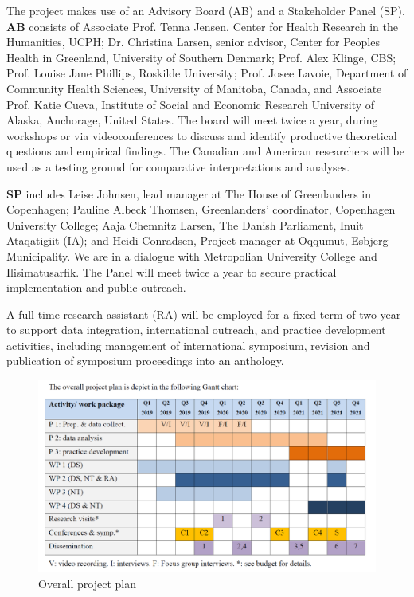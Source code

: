 \documentclass[twocolumn, issue, rga, authordate]{jote-new-article}
\begin{document}
The project makes use of an Advisory Board (AB) and a Stakeholder Panel
(SP). \textbf{AB} consists of Associate Prof. Tenna Jensen, Center for Health Research in the Humanities, UCPH; Dr. Christina Larsen, senior advisor, Center for Peoples Health in Greenland, University of Southern Denmark; Prof. Alex Klinge, CBS; Prof. Louise Jane Phillips, Roskilde University; Prof. Josee Lavoie, Department of Community Health Sciences, University of Manitoba, Canada, and Associate Prof. Katie Cueva, Institute of Social and Economic Research University of Alaska, Anchorage, United States. The board will meet twice a year, during workshops or via videoconferences to discuss and identify productive theoretical questions and empirical findings. The Canadian and American researchers will be used as a testing ground for comparative interpretations and analyses.

\textbf{SP} includes Leise Johnsen, lead manager at The House of Greenlanders in Copenhagen; Pauline Albeck Thomsen, Greenlanders'
coordinator, Copenhagen University College; Aaja Chemnitz Larsen, The Danish Parliament, Inuit Ataqatigiit (IA); and Heidi Conradsen, Project manager at Oqqumut, Esbjerg Municipality. We are in a dialogue with Metropolian University College and Ilisimatusarfik. The Panel will meet twice a year to secure practical implementation and public outreach.

A full-time research assistant (RA) will be employed for a fixed term of two year to support data integration, international outreach, and practice development activities, including management of international symposium, revision and publication of symposium proceedings into an anthology.

\begin{figure}
\includegraphics[width=\linewidth]{media/image1.png}
\caption{Overall project plan}

\end{figure}
\end{document}
